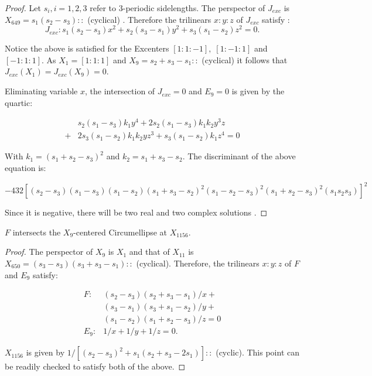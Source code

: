 \begin{proof}
Let $s_i,i=1,2,3$ refer to 3-periodic sidelengths. The perspector of $J_{exc}$ is $X_{649}=s_1(s_2-s_3)::$ (cyclical) \cite{etc}. Therefore the trilinears $x:y:z$ of $J_{exc}$ satisfy \cite{yiu2003}:
 \[J_{exc}: {s_1(s_2-s_3)}x^2+s_2(s_3-s_1)y^2+s_3(s_1-s_2)z^2=0.\]
 
Notice the above is satisfied for the Excenters $[1:1:-1],\; [1:-1:1]$ and $ [-1:1:1]$. As $X_1=[1:1:1]$ and $X_9=s_2+s_3-s_1::$ (cyclical) it follows that
 $J_{exc}(X_1)=J_{exc}(X_9)=0$.
 
 Eliminating variable $x$, the intersection of $J_{exc}=0$ and $E_9=0$ is given by the quartic:
 
 \begin{align*}
 &s_2(s_1-s_3)k_1 y^4+2s_2(s_1-s_3){k_1}{k_2}y^3 z\\
 +&2s_3(s_1-s_2){k_1}{k_2}y z^3+s_3(s_1-s_2)k_1 z^4=0
 \end{align*}
 
With $k_1=(s_1+s_2-s_3)^2$ and $k_2=s_1+s_3-s_2$. The discriminant of the above equation is:
 
 \[
 -432[(s_2-s_3)(s_1-s_3)(s_1-s_2)(s_1+s_3-s_2)^2(s_1-s_2-s_3)^2(s_1+s_2-s_3)^2(s_1s_2s_3)]^2
 \]
 
Since it is negative, there will be two real and two complex solutions \cite{burnside_1960}.
\end{proof}



\begin{proposition}
$F$ intersects the $X_9$-centered Circumellipse at $X_{1156}$.
\end{proposition}

\begin{proof}
The perspector of $X_9$ is $X_1$ and that of $X_{11} $ is $X_{650}=(s_3-s_3)(s_3+s_3-s_1)::$ (cyclical). Therefore, the trilinears $x:y:z$ of $F$ and $E_9$ satisfy:

\begin{align*}
    F:&(s_2-s_3)(s_2+s_3-s_1)/x+\\
    &(s_3-s_1)(s_3+s_1-s_2)/y+\\
    &(s_1-s_2)(s_1+s_2-s_3)/z=0 \\
    E_9:& 1/x+1/y+1/z=0.
\end{align*} 

$X_{1156}$ is given by $1/[(s_2-s_3)^{2}+s_1( s_2+s_3-2s_1)]::$ (cyclic). This point can be readily checked to satisfy both of the above.
\end{proof}
 
